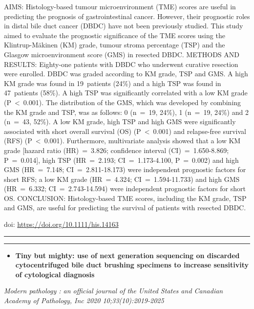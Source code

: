 \documentclass[
]{article}
\providecommand{\tightlist}{%
  \setlength{\itemsep}{0pt}\setlength{\parskip}{0pt}}
\begin{document}
AIMS: Histology-based tumour microenvironment (TME) scores are useful in
predicting the prognosis of gastrointestinal cancer. However, their
prognostic roles in distal bile duct cancer (DBDC) have not been
previously studied. This study aimed to evaluate the prognostic
significance of the TME scores using the Klintrup-Mäkinen (KM) grade,
tumour stroma percentage (TSP) and the Glasgow microenvironment score
(GMS) in resected DBDC. METHODS AND RESULTS: Eighty-one patients with
DBDC who underwent curative resection were enrolled. DBDC was graded
according to KM grade, TSP and GMS. A high KM grade was found in
19~patients (24\%) and a high TSP was found in 47~patients (58\%). A
high TSP was significantly correlated with a low KM grade
(P~\textless~0.001). The distribution of the GMS, which was developed by
combining the KM grade and TSP, was as follows: 0 (n~=~19, 24\%), 1
(n~=~19, 24\%) and 2 (n~=~43, 52\%). A low KM grade, high TSP and high
GMS were significantly associated with short overall survival (OS)
(P~\textless~0.001) and relapse-free survival (RFS) (P~\textless~0.001).
Furthermore, multivariate analysis showed that a low KM grade {[}hazard
ratio (HR)~=~3.826; confidence interval (CI)~=~1.650-8.869;
P~=~0.014{]}, high TSP (HR~=~2.193; CI~=~1.173-4.100, P~=~0.002) and
high GMS (HR~=~7.148; CI~=~2.811-18.173) were independent prognostic
factors for short RFS; a low KM grade (HR~=~4.324; CI~=~1.594-11.733)
and high GMS (HR~=~6.332; CI~=~2.743-14.594) were independent prognostic
factors for short OS. CONCLUSION: Histology-based TME scores, including
the KM grade, TSP and GMS, are useful for predicting the survival of
patients with resected DBDC.

doi: \url{https://doi.org/10.1111/his.14163}

\begin{center}\rule{0.5\linewidth}{0.5pt}\end{center}

\begin{center}\rule{0.5\linewidth}{0.5pt}\end{center}

\begin{itemize}
\tightlist
\item
  \textbf{Tiny but mighty: use of next generation sequencing on
  discarded cytocentrifuged bile duct brushing specimens to increase
  sensitivity of cytological diagnosis}
\end{itemize}

\emph{Modern pathology : an official journal of the United States and
Canadian Academy of Pathology, Inc 2020 10;33(10):2019-2025}
\end{document}
